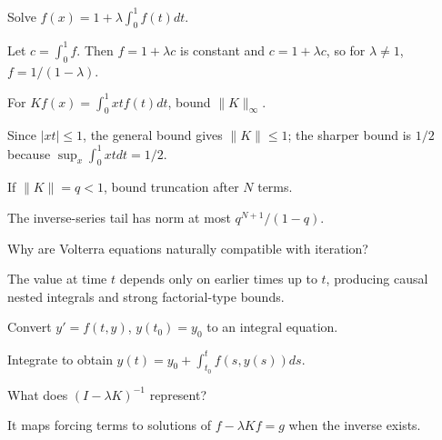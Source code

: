 \begin{problem}\label{prob:ii18-problem-01}
Solve $f(x)=1+\lambda\int_0^1f(t)dt$.
\end{problem}
\begin{solution}
Let $c=\int_0^1f$. Then $f=1+\lambda c$ is constant and $c=1+\lambda c$, so for $\lambda\ne1$, $f=1/(1-\lambda)$.
\end{solution}

\begin{problem}\label{prob:ii18-problem-02}
For $Kf(x)=\int_0^1xtf(t)dt$, bound $\|K\|_\infty$.
\end{problem}
\begin{solution}
Since $|xt|\le1$, the general bound gives $\|K\|\le1$; the sharper bound is $1/2$ because $\sup_x\int_0^1xtdt=1/2$.
\end{solution}

\begin{problem}\label{prob:ii18-problem-03}
If $\|K\|=q<1$, bound truncation after $N$ terms.
\end{problem}
\begin{solution}
The inverse-series tail has norm at most $q^{N+1}/(1-q)$.
\end{solution}

\begin{problem}\label{prob:ii18-problem-04}
Why are Volterra equations naturally compatible with iteration?
\end{problem}
\begin{solution}
The value at time $t$ depends only on earlier times up to $t$, producing causal nested integrals and strong factorial-type bounds.
\end{solution}

\begin{problem}\label{prob:ii18-problem-05}
Convert $y'=f(t,y)$, $y(t_0)=y_0$ to an integral equation.
\end{problem}
\begin{solution}
Integrate to obtain $y(t)=y_0+\int_{t_0}^tf(s,y(s))ds$.
\end{solution}

\begin{problem}\label{prob:ii18-problem-06}
What does $(I-\lambda K)^{-1}$ represent?
\end{problem}
\begin{solution}
It maps forcing terms to solutions of $f-\lambda Kf=g$ when the inverse exists.
\end{solution}

